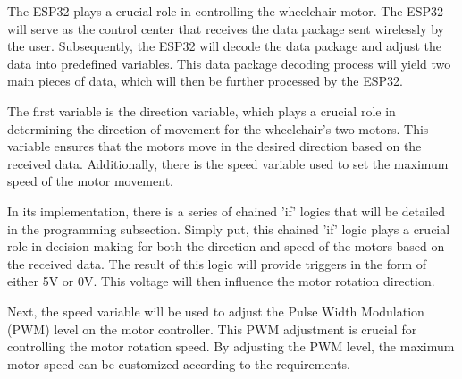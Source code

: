 The ESP32 plays a crucial role in controlling the wheelchair motor. The ESP32 will serve as the control center that receives the data package sent wirelessly by the user. Subsequently, the ESP32 will decode the data package and adjust the data into predefined variables. This data package decoding process will yield two main pieces of data, which will then be further processed by the ESP32.

The first variable is the direction variable, which plays a crucial role in determining the direction of movement for the wheelchair's two motors. This variable ensures that the motors move in the desired direction based on the received data. Additionally, there is the speed variable used to set the maximum speed of the motor movement.

In its implementation, there is a series of chained 'if' logics that will be detailed in the programming subsection. Simply put, this chained 'if' logic plays a crucial role in decision-making for both the direction and speed of the motors based on the received data. The result of this logic will provide triggers in the form of either 5V or 0V. This voltage will then influence the motor rotation direction.

Next, the speed variable will be used to adjust the Pulse Width Modulation (PWM) level on the motor controller. This PWM adjustment is crucial for controlling the motor rotation speed. By adjusting the PWM level, the maximum motor speed can be customized according to the requirements.

